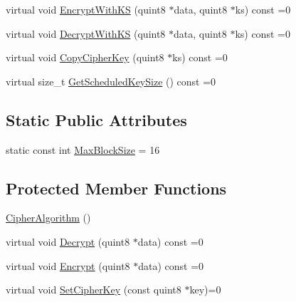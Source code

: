 \begin{DoxyCompactItemize}
virtual void \hyperlink{class_gost_crypt_1_1_volume_1_1_cipher_algorithm_a6e7b19a0078b49c10536ad2f73b3b1ae}{Encrypt\+With\+KS} (quint8 $\ast$data, quint8 $\ast$ks) const =0
\item 
virtual void \hyperlink{class_gost_crypt_1_1_volume_1_1_cipher_algorithm_aa08e6b739411e759a0489668e818e08b}{Decrypt\+With\+KS} (quint8 $\ast$data, quint8 $\ast$ks) const =0
\item 
virtual void \hyperlink{class_gost_crypt_1_1_volume_1_1_cipher_algorithm_a53e0b1102294d29252b6438f5bf999aa}{Copy\+Cipher\+Key} (quint8 $\ast$ks) const =0
\item 
virtual size\+\_\+t \hyperlink{class_gost_crypt_1_1_volume_1_1_cipher_algorithm_a8d39c267bba1bea5b7e51b803d426b9c}{Get\+Scheduled\+Key\+Size} () const =0
\end{DoxyCompactItemize}
\subsection*{Static Public Attributes}
\begin{DoxyCompactItemize}
\item 
static const int \hyperlink{class_gost_crypt_1_1_volume_1_1_cipher_algorithm_a224409c9d61c25ae972c64bb38633fad}{Max\+Block\+Size} = 16
\end{DoxyCompactItemize}
\subsection*{Protected Member Functions}
\begin{DoxyCompactItemize}
\item 
\hyperlink{class_gost_crypt_1_1_volume_1_1_cipher_algorithm_a4bdc79ef9cad87003feb6fa8981ee2a8}{Cipher\+Algorithm} ()
\item 
virtual void \hyperlink{class_gost_crypt_1_1_volume_1_1_cipher_algorithm_a014d9a3b3db18ec963c0e524b4f0d445}{Decrypt} (quint8 $\ast$data) const =0
\item 
virtual void \hyperlink{class_gost_crypt_1_1_volume_1_1_cipher_algorithm_a4e8eda4efa7393fa17be1f5dae6cc0e2}{Encrypt} (quint8 $\ast$data) const =0
\item 
virtual void \hyperlink{class_gost_crypt_1_1_volume_1_1_cipher_algorithm_a98760f7a389f6fb5fd1d2078d0c1580f}{Set\+Cipher\+Key} (const quint8 $\ast$key)=0
\end{DoxyCompactItemize}
